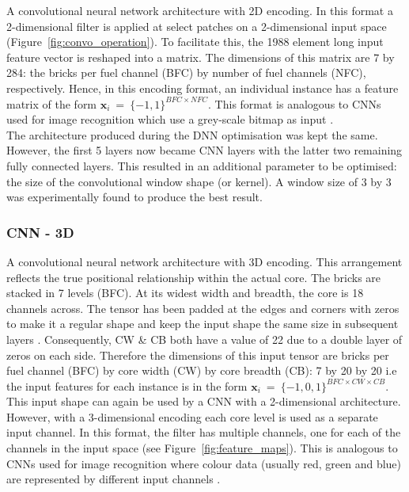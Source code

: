 A convolutional neural network architecture with 2D encoding. In this format a 2-dimensional filter is applied at select patches on a 2-dimensional input space (Figure~\ref{fig:convo_operation}). To facilitate this, the 1988 element long input feature vector is reshaped into a matrix. The dimensions of this matrix are 7 by 284: the bricks per fuel channel (BFC) by number of fuel channels (NFC), respectively. Hence, in this encoding format, an individual instance has a feature matrix of the form $\textbf{x}_i~=~\{-1, 1\}^{BFC \times NFC}$. This format is analogous to CNNs used for image recognition which use a grey-scale bitmap as input \cite{bui2016using}. 
\\

\noindent
The architecture produced during the DNN optimisation was kept the same. However, the first 5 layers now became CNN layers with the latter two remaining fully connected layers. This resulted in an additional parameter to be optimised: the size of the convolutional window shape (or kernel). A window size of 3 by 3 was experimentally found to produce the best result.

\subsubsection{CNN - 3D} A convolutional neural network architecture with 3D encoding. This arrangement reflects the true positional relationship within the actual core. The bricks are stacked in 7 levels (BFC). At its widest width and breadth, the core is 18 channels across. The tensor has been padded at the edges and corners with zeros to make it a regular shape and keep the input shape the same size in subsequent layers \cite{dwarampudi2019effects}. Consequently, CW \& CB both have a value of 22 due to a double layer of zeros on each side. Therefore the dimensions of this input tensor are bricks per fuel channel (BFC) by core width (CW) by core breadth (CB): 7 by 20 by 20 i.e the input features for each instance is in the form $ \textbf{x}_i~=~\{-1, 0, 1\}^{BFC \times CW \times CB}$. This input shape can again be used by a CNN with a 2-dimensional architecture. However, with a 3-dimensional encoding each core level is used as a separate input channel. In this format, the filter has multiple channels, one for each of the channels in the input space (see Figure~\ref{fig:feature_maps}). This is analogous to CNNs used for image recognition where colour data (usually red, green and blue) are represented by different input channels \cite{albawi2017understanding}. 

